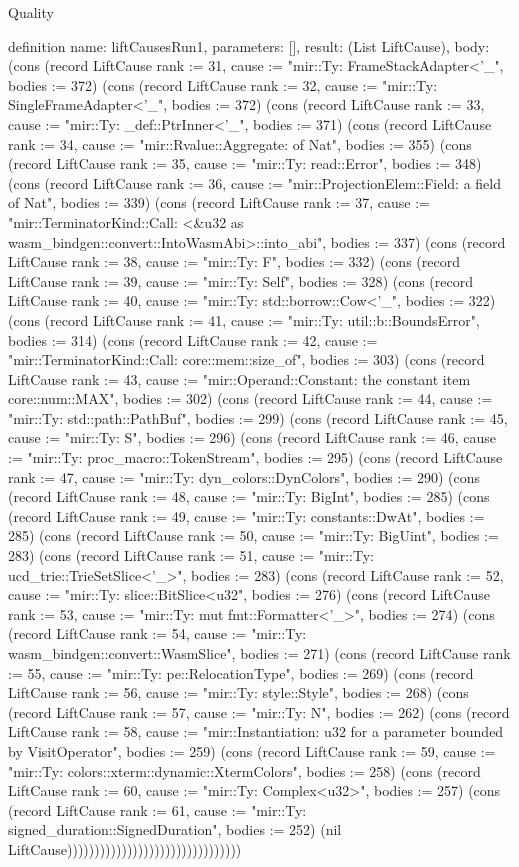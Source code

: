 \begin{lexlean}{Quality}
\begin{semanticmodule}
definition{
  name: liftCausesRun1,
  parameters: [],
  result: (List LiftCause),
  body: (cons (record LiftCause {rank := 31, cause := "mir::Ty: FrameStackAdapter<'_", bodies := 372}) (cons (record LiftCause {rank := 32, cause := "mir::Ty: SingleFrameAdapter<'_", bodies := 372}) (cons (record LiftCause {rank := 33, cause := "mir::Ty: _def::PtrInner<'_", bodies := 371}) (cons (record LiftCause {rank := 34, cause := "mir::Rvalue::Aggregate: of Nat", bodies := 355}) (cons (record LiftCause {rank := 35, cause := "mir::Ty: read::Error", bodies := 348}) (cons (record LiftCause {rank := 36, cause := "mir::ProjectionElem::Field: a field of Nat", bodies := 339}) (cons (record LiftCause {rank := 37, cause := "mir::TerminatorKind::Call: <&u32 as wasm_bindgen::convert::IntoWasmAbi>::into_abi", bodies := 337}) (cons (record LiftCause {rank := 38, cause := "mir::Ty: F", bodies := 332}) (cons (record LiftCause {rank := 39, cause := "mir::Ty: Self", bodies := 328}) (cons (record LiftCause {rank := 40, cause := "mir::Ty: std::borrow::Cow<'_", bodies := 322}) (cons (record LiftCause {rank := 41, cause := "mir::Ty: util::b::BoundsError", bodies := 314}) (cons (record LiftCause {rank := 42, cause := "mir::TerminatorKind::Call: core::mem::size_of", bodies := 303}) (cons (record LiftCause {rank := 43, cause := "mir::Operand::Constant: the constant item core::num::MAX", bodies := 302}) (cons (record LiftCause {rank := 44, cause := "mir::Ty: std::path::PathBuf", bodies := 299}) (cons (record LiftCause {rank := 45, cause := "mir::Ty: S", bodies := 296}) (cons (record LiftCause {rank := 46, cause := "mir::Ty: proc_macro::TokenStream", bodies := 295}) (cons (record LiftCause {rank := 47, cause := "mir::Ty: dyn_colors::DynColors", bodies := 290}) (cons (record LiftCause {rank := 48, cause := "mir::Ty: BigInt", bodies := 285}) (cons (record LiftCause {rank := 49, cause := "mir::Ty: constants::DwAt", bodies := 285}) (cons (record LiftCause {rank := 50, cause := "mir::Ty: BigUint", bodies := 283}) (cons (record LiftCause {rank := 51, cause := "mir::Ty: ucd_trie::TrieSetSlice<'_>", bodies := 283}) (cons (record LiftCause {rank := 52, cause := "mir::Ty: slice::BitSlice<u32", bodies := 276}) (cons (record LiftCause {rank := 53, cause := "mir::Ty: mut fmt::Formatter<'_>", bodies := 274}) (cons (record LiftCause {rank := 54, cause := "mir::Ty: wasm_bindgen::convert::WasmSlice", bodies := 271}) (cons (record LiftCause {rank := 55, cause := "mir::Ty: pe::RelocationType", bodies := 269}) (cons (record LiftCause {rank := 56, cause := "mir::Ty: style::Style", bodies := 268}) (cons (record LiftCause {rank := 57, cause := "mir::Ty: N", bodies := 262}) (cons (record LiftCause {rank := 58, cause := "mir::Instantiation: u32 for a parameter bounded by VisitOperator", bodies := 259}) (cons (record LiftCause {rank := 59, cause := "mir::Ty: colors::xterm::dynamic::XtermColors", bodies := 258}) (cons (record LiftCause {rank := 60, cause := "mir::Ty: Complex<u32>", bodies := 257}) (cons (record LiftCause {rank := 61, cause := "mir::Ty: signed_duration::SignedDuration", bodies := 252}) (nil LiftCause))))))))))))))))))))))))))))))))
}


\end{semanticmodule}
\end{lexlean}
